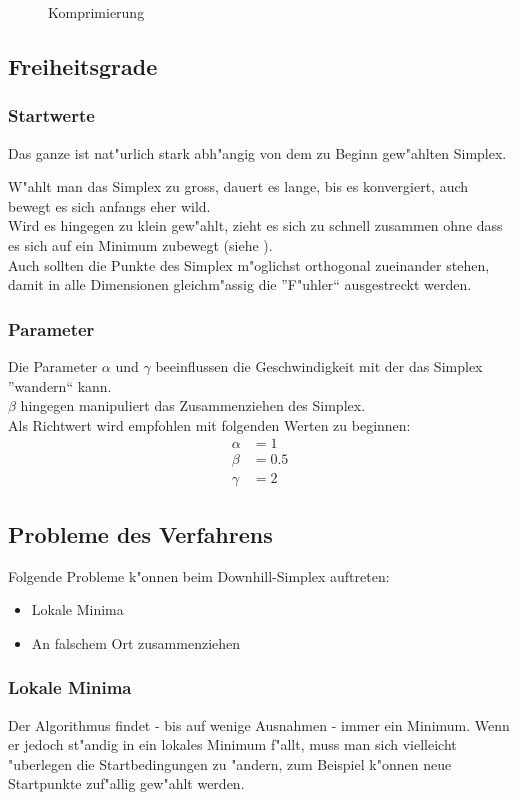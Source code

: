 \begin{figure}[h]
	\centering
  	\caption{Komprimierung}%
	\label{fig:komp}%
\end{figure}

\subsection{Freiheitsgrade}
\subsubsection{Startwerte}
Das ganze ist nat"urlich stark abh"angig von dem zu Beginn gew"ahlten Simplex.

W"ahlt man das Simplex zu gross, dauert es lange, bis es konvergiert, auch bewegt es sich anfangs eher wild.\\
Wird es hingegen zu klein gew"ahlt, zieht es sich zu schnell zusammen ohne dass es sich auf ein Minimum zubewegt (siehe ).\\
Auch sollten die Punkte des Simplex m"oglichst orthogonal zueinander stehen, damit in alle Dimensionen gleichm"assig die ''F"uhler`` ausgestreckt werden.

\subsubsection{Parameter}
Die Parameter $\alpha$ und $\gamma$ beeinflussen die Geschwindigkeit mit der das Simplex ''wandern`` kann.\\
$\beta$ hingegen manipuliert das Zusammenziehen des Simplex.\\
Als Richtwert wird empfohlen mit folgenden Werten zu beginnen:
\begin{align*}
\alpha &= 1 \\
\beta &= 0.5 \\
\gamma &= 2
\end{align*}

\subsection{Probleme des Verfahrens}
Folgende Probleme k"onnen beim Downhill-Simplex auftreten:
\begin{itemize}
\item Lokale Minima
\item An falschem Ort zusammenziehen
\end{itemize}

\subsubsection{Lokale Minima}
Der Algorithmus findet - bis auf wenige Ausnahmen - immer ein Minimum. Wenn er jedoch st"andig in ein lokales Minimum f"allt, muss man sich vielleicht "uberlegen die Startbedingungen zu "andern, 
zum Beispiel k"onnen neue Startpunkte zuf"allig gew"ahlt werden.


